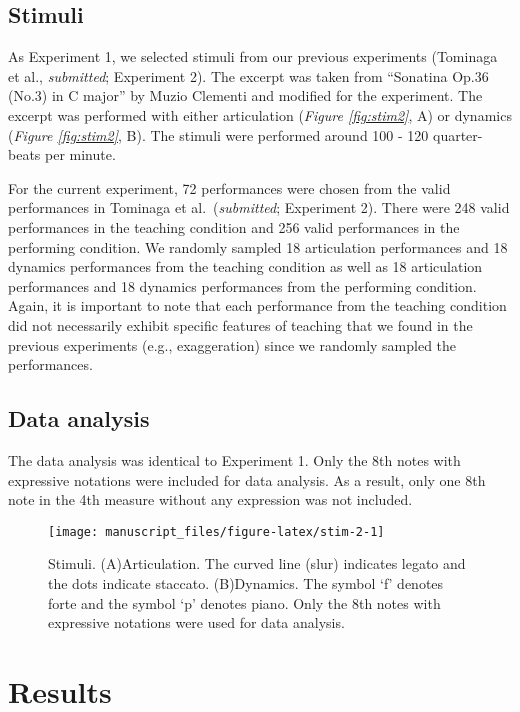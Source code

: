 \documentclass[
  man,floatsintext]{apa6}
\begin{document}
\hypertarget{stimuli-1}{%
\subsection{Stimuli}\label{stimuli-1}}

As Experiment 1, we selected stimuli from our previous experiments (Tominaga et al., \emph{submitted}; Experiment 2). The excerpt was taken from ``Sonatina Op.36 (No.3) in C major'' by Muzio Clementi and modified for the experiment. The excerpt was performed with either articulation (\emph{Figure \ref{fig:stim2}}, A) or dynamics (\emph{Figure \ref{fig:stim2}}, B). The stimuli were performed around 100 - 120 quarter-beats per minute.

For the current experiment, 72 performances were chosen from the valid performances in Tominaga et al.~(\emph{submitted}; Experiment 2). There were 248 valid performances in the teaching condition and 256 valid performances in the performing condition. We randomly sampled 18 articulation performances and 18 dynamics performances from the teaching condition as well as 18 articulation performances and 18 dynamics performances from the performing condition. Again, it is important to note that each performance from the teaching condition did not necessarily exhibit specific features of teaching that we found in the previous experiments (e.g., exaggeration) since we randomly sampled the performances.

\hypertarget{data-analysis-1}{%
\subsection{Data analysis}\label{data-analysis-1}}

The data analysis was identical to Experiment 1. Only the 8th notes with expressive notations were included for data analysis. As a result, only one 8th note in the 4th measure without any expression was not included.

\begin{figure}
\texttt{[image: manuscript\_files/figure-latex/stim-2-1]} \caption{\label{fig:stim2}Stimuli. (A)Articulation. The curved line (slur) indicates legato and the dots indicate staccato. (B)Dynamics. The symbol `f' denotes forte and the symbol `p' denotes piano. Only the 8th notes with expressive notations were used for data analysis.}\label{fig:stim-2}
\end{figure}

\hypertarget{results-1}{%
\section{Results}\label{results-1}}
\end{document}

